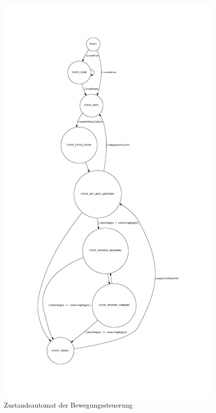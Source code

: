 \begin{figure}[hbtp]
\centering
\includegraphics[scale=1.5]{images/chapter5/StateModel.pdf}
\caption{Zustandsautomat der Bewegungssteuerung}
\label{fig:Zustandsautomat}
\end{figure}